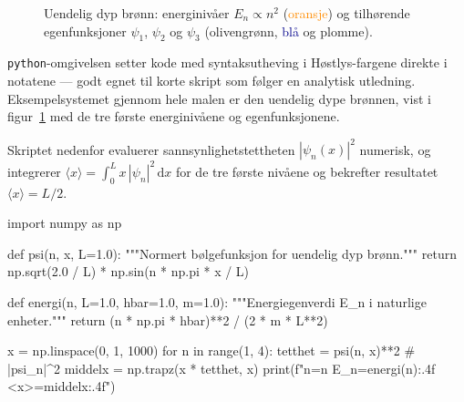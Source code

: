 \documentclass[a4paper,11pt]{article}
\begin{document}
\begin{figure}[H]
  \centering
  \caption{Uendelig dyp brønn: energinivåer $E_n \propto n^2$
           (\textcolor{darkorange}{oransje}) og tilhørende egenfunksjoner $\psi_1$, $\psi_2$ og $\psi_3$ (\textcolor{darkolive}{olivengrønn}, \textcolor{darkblue}{blå} og \textcolor{darkplum}{plomme}).}
  \label{fig:bronnn}
\end{figure}

\verb|python|-omgivelsen setter kode med syntaksutheving i Høstlys-fargene direkte i notatene — godt egnet til korte skript som følger en analytisk utledning. Eksempelsystemet gjennom hele malen er den uendelig dype brønnen, vist i figur~\ref{fig:bronnn} med de tre første energinivåene og egenfunksjonene.

Skriptet nedenfor evaluerer sannsynlighetstettheten $|\psi_n(x)|^2$ numerisk, og integrerer $\langle x \rangle = \int_0^L x\,|\psi_n|^2\,\mathrm{d}x$ for de tre første nivåene og bekrefter resultatet $\langle x \rangle = L/2$.

\begin{python}
import numpy as np

def psi(n, x, L=1.0):
    """Normert bølgefunksjon for uendelig dyp brønn."""
    return np.sqrt(2.0 / L) * np.sin(n * np.pi * x / L)

def energi(n, L=1.0, hbar=1.0, m=1.0):
    """Energiegenverdi E_n i naturlige enheter."""
    return (n * np.pi * hbar)**2 / (2 * m * L**2)

x = np.linspace(0, 1, 1000)
for n in range(1, 4):
    tetthet = psi(n, x)**2          # |psi_n|^2
    middelx = np.trapz(x * tetthet, x)
    print(f"n={n}  E_n={energi(n):.4f}  <x>={middelx:.4f}")
\end{python}
\end{document}
